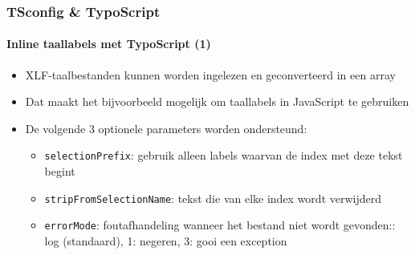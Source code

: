 \begin{frame}[fragile]
	\frametitle{TSconfig \& TypoScript}
	\framesubtitle{Inline taallabels met TypoScript (1)}

	\lstset{basicstyle=\tiny\ttfamily}

	\begin{itemize}

		\item XLF-taalbestanden kunnen worden ingelezen en geconverteerd in een array

		\item Dat maakt het bijvoorbeeld mogelijk om taallabels in JavaScript te gebruiken

		\item De volgende 3 optionele parameters worden ondersteund:

			\begin{itemize}
				\item \texttt{selectionPrefix}:\newline
					gebruik alleen labels waarvan de index met deze tekst begint
				\item \texttt{stripFromSelectionName}:\newline
					tekst die van elke index wordt verwijderd
				\item \texttt{errorMode}:\newline
					foutafhandeling wanneer het bestand niet wordt gevonden:: log (standaard), 1: negeren, 3: gooi een exception
			\end{itemize}

	\end{itemize}

\end{frame}

